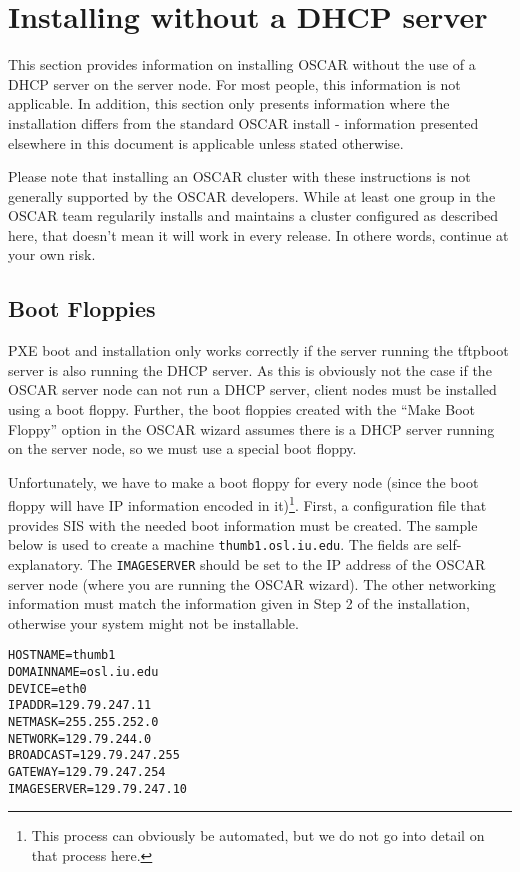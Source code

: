\section{Installing without a DHCP server}
\label{app:no_dhcp}

This section provides information on installing OSCAR without the use
of a DHCP server on the server node.  For most people, this
information is not applicable.  In addition, this section only
presents information where the installation differs from the standard
OSCAR install - information presented elsewhere in this document is
applicable unless stated otherwise.

Please note that installing an OSCAR cluster with these instructions
is not generally supported by the OSCAR developers.  While at least
one group in the OSCAR team regularily installs and maintains a
cluster configured as described here, that doesn't mean it will work
in every release.  In othere words, continue at your own risk.

\subsection{Boot Floppies}

PXE boot and installation only works correctly if the server running
the tftpboot server is also running the DHCP server.  As this is
obviously not the case if the OSCAR server node can not run a DHCP
server, client nodes must be installed using a boot floppy.  Further,
the boot floppies created with the ``Make Boot Floppy'' option in the
OSCAR wizard assumes there is a DHCP server running on the server
node, so we must use a special boot floppy.

Unfortunately, we have to make a boot floppy for every node (since the
boot floppy will have IP information encoded in it)\footnote{This
process can obviously be automated, but we do not go into detail on
that process here.}.  First, a configuration file that provides SIS
with the needed boot information must be created.  The sample below
is used to create a machine {\tt thumb1.osl.iu.edu}.  The fields are
self-explanatory.  The {\tt IMAGESERVER} should be set to the IP
address of the OSCAR server node (where you are running the OSCAR
wizard).  The other networking information must match the information
given in Step 2 of the installation, otherwise your system might not
be installable.

\begin{verbatim}
HOSTNAME=thumb1
DOMAINNAME=osl.iu.edu
DEVICE=eth0
IPADDR=129.79.247.11
NETMASK=255.255.252.0
NETWORK=129.79.244.0
BROADCAST=129.79.247.255
GATEWAY=129.79.247.254
IMAGESERVER=129.79.247.10
\end{verbatim}

